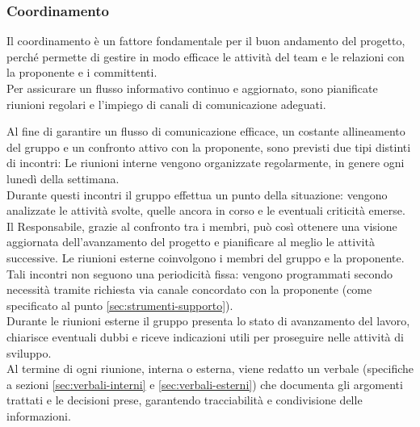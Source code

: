 \subsubsection{Coordinamento}
Il coordinamento è un fattore fondamentale per il buon andamento del progetto, perché permette di gestire in modo efficace le attività del team e le relazioni con la proponente e i committenti.\\
Per assicurare un flusso informativo continuo e aggiornato, sono pianificate riunioni regolari e l’impiego di canali di comunicazione adeguati.

Al fine di garantire un flusso di comunicazione efficace, un costante allineamento del gruppo e un confronto attivo con la proponente, sono previsti due tipi distinti di incontri:
Le riunioni interne vengono organizzate regolarmente, in genere ogni lunedì della settimana.\\
Durante questi incontri il gruppo effettua un punto della situazione: vengono analizzate le attività svolte, quelle ancora in corso e le eventuali criticità emerse.\\
Il Responsabile, grazie al confronto tra i membri, può così ottenere una visione aggiornata dell’avanzamento del progetto e pianificare al meglio le attività successive.
Le riunioni esterne coinvolgono i membri del gruppo e la proponente.\\
Tali incontri non seguono una periodicità fissa: vengono programmati secondo necessità tramite richiesta via canale concordato con la proponente (come specificato al punto \ref{sec:strumenti-supporto}).\\
Durante le riunioni esterne il gruppo presenta lo stato di avanzamento del lavoro, chiarisce eventuali dubbi e riceve indicazioni utili per proseguire nelle attività di sviluppo.\\
Al termine di ogni riunione, interna o esterna, viene redatto un verbale (specifiche a sezioni \ref{sec:verbali-interni} e \ref{sec:verbali-esterni}) che documenta gli argomenti trattati e le decisioni prese, garantendo tracciabilità e condivisione delle informazioni.

